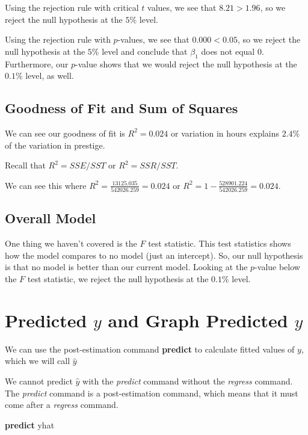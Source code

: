 \documentclass[
]{book}
\newenvironment{Shaded}{\begin{snugshade}}{\end{snugshade}}
\newcommand{\KeywordTok}[1]{\textcolor[rgb]{0.13,0.29,0.53}{\textbf{#1}}}
\newcommand{\NormalTok}[1]{#1}
\begin{document}
Using the rejection rule with critical \(t\) values, we see that \(8.21 > 1.96\), so we reject the null hypothesis at the \(5\%\) level.

Using the rejection rule with \(p\)-values, we see that \(0.000<0.05\), so we reject the null hypothesis at the \(5\%\) level and conclude that \(\beta_1\) does not equal 0. Furthermore, our \(p\)-value shows that we would reject the null hypothesis at the \(0.1\%\) level, as well.

\subsection{Goodness of Fit and Sum of Squares}\label{goodness-of-fit-and-sum-of-squares}

We can see our goodness of fit is \(R^2=0.024\) or variation in hours explains \(2.4\%\) of the variation in prestige.

Recall that \(R^2=SSE/SST\) or \(R^2=SSR/SST\).

We can see this where \(R^2=\frac{13125.035}{542026.259}=0.024\) or \(R^2=1-\frac{528901.224 }{542026.259}=0.024\).

\subsection{Overall Model}\label{overall-model}

One thing we haven't covered is the \(F\) test statistic. This test statistics shows how the model compares to no model (just an intercept). So, our null hypothesis is that no model is better than our current model. Looking at the \(p\)-value below the \(F\) test statistic, we reject the null hypothesis at the \(0.1\%\) level.

\section{\texorpdfstring{Predicted \(y\) and Graph Predicted \(y\)}{Predicted y and Graph Predicted y}}\label{predicted-y-and-graph-predicted-y}

We can use the post-estimation command \textbf{predict} to calculate fitted values of \(y\), which we will call \(\hat{y}\)

We cannot predict \(\hat{y}\) with the \emph{predict} command without the \emph{regress} command. The \emph{predict} command is a post-estimation command, which means that it must come after a \emph{regress} command.

\begin{Shaded}
\begin{Highlighting}[]
\KeywordTok{predict}\NormalTok{ yhat}
\end{Highlighting}
\end{Shaded}
\end{document}
